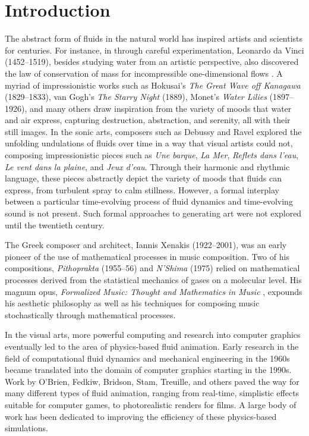 \chapter{Introduction}
\label{chap:Intro}

The abstract form of fluids in the natural world has inspired artists and scientists for centuries. 
For instance, in through careful experimentation, Leonardo da Vinci (1452--1519), besides studying water from an artistic perspective, also discovered the law of conservation of mass for incompressible one-dimensional flows \cite{gad1998fluid}. A myriad of impressionistic works such as Hokusai's {\em The Great Wave off Kanagawa} (1829--1833), van Gogh's {\em The Starry Night} (1889), Monet's {\em Water Lilies} (1897--1926), and many others draw inspiration from the variety of moods that water and air express, capturing destruction, abstraction, and serenity, all with their still images. In the sonic arts, composers such as Debussy and Ravel explored the unfolding undulations of fluids over time in a way that visual artists could not, composing impressionistic pieces such as {\em Une barque}, {\em La Mer}, {\em Reflets dans l'eau}, {\em Le vent dans la plaine}, and {\em Jeux d'eau}. Through their harmonic and rhythmic language, these pieces abstractly depict the variety of moods that fluids can express, from turbulent spray to calm stillness. However, a formal interplay between a particular time-evolving process of fluid dynamics and time-evolving sound is not present. Such formal approaches to generating art were not explored until the twentieth century.

The Greek composer and architect, Iannis Xenakis (1922--2001), was an early pioneer of the use of mathematical processes in music composition. Two of his compositions, {\em Pithoprakta} (1955--56) and {\em N'Shima} (1975) relied on mathematical processes derived from the statistical mechanics of gases on a molecular level. His magnum opus, {\em Formalized Music: Thought and Mathematics in Music} \cite{xenakis1992formalized}, expounds his aesthetic philosophy as well as his techniques for composing music stochastically through mathematical processes. 

In the visual arts, more powerful computing and research into computer graphics eventually led to the area of physics-based fluid animation. Early research in the field of computational fluid dynamics and mechanical engineering in the 1960s became translated into the domain of computer graphics starting in the 1990s. Work by O'Brien, Fedkiw, Bridson, Stam, Treuille, and others paved the way for many different types of fluid animation, ranging from real-time, simplistic effects suitable for computer games, to photorealistic renders for films. A large body of work has been dedicated to improving the efficiency of these physics-based simulations. 

